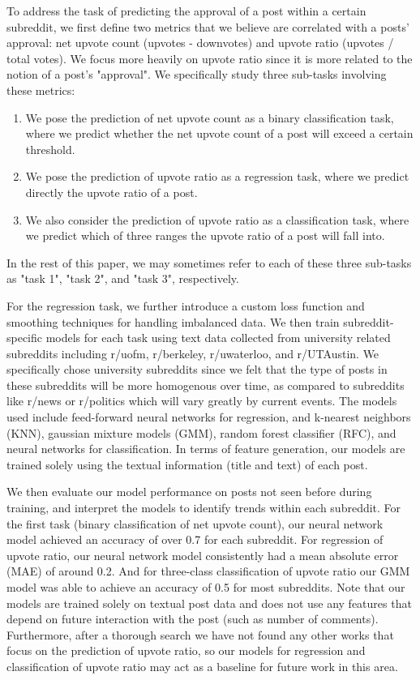\documentclass[11pt,a4paper]{article}
\begin{document}
    To address the task of predicting the approval of a post within a certain subreddit, we first define two metrics that we believe are correlated with a posts' approval: net upvote count (upvotes - downvotes) and upvote ratio (upvotes / total votes). We focus more heavily on upvote ratio since it is more related to the notion of a post's "approval". We specifically study three sub-tasks involving these metrics:
    \begin{enumerate}
        \item We pose the prediction of net upvote count as a binary classification task, where we predict whether the net upvote count of a post will exceed a certain threshold.
        \item We pose the prediction of upvote ratio as a regression task, where we predict directly the upvote ratio of a post.
        \item We also consider the prediction of upvote ratio as a classification task, where we predict which of three ranges the upvote ratio of a post will fall into.
    \end{enumerate}
    In the rest of this paper, we may sometimes refer to each of these three sub-tasks as "task 1", "task 2", and "task 3", respectively.
    
    For the regression task, we further introduce a custom loss function and smoothing techniques for handling imbalanced data. We then train subreddit-specific models for each task using text data collected from university related subreddits including r/uofm, r/berkeley, r/uwaterloo, and r/UTAustin. We specifically chose university subreddits since we felt that the type of posts in these subreddits will be more homogenous over time, as compared to subreddits like r/news or r/politics which will vary greatly by current events. The models used include feed-forward neural networks for regression, and k-nearest neighbors (KNN), gaussian mixture models (GMM), random forest classifier (RFC), and neural networks for classification. In terms of feature generation, our models are trained solely using the textual information (title and text) of each post.

    We then evaluate our model performance on posts not seen before during training, and interpret the models to identify trends within each subreddit. For the  first task (binary classification of net upvote count), our neural network model achieved an accuracy of over 0.7 for each subreddit. For regression of upvote ratio, our neural network model consistently had a mean absolute error (MAE) of around 0.2. And for three-class classification of upvote ratio our GMM model was able to achieve an accuracy of 0.5 for most subreddits. Note that our models are trained solely on textual post data and does not use any features that depend on future interaction with the post (such as number of comments). Furthermore, after a thorough search we have not found any other works that focus on the prediction of upvote ratio, so our models for regression and classification of upvote ratio may act as a baseline for future work in this area.
\end{document}
